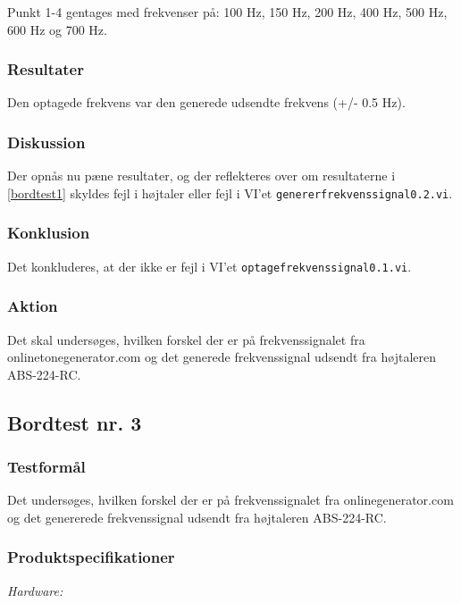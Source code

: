 			Punkt 1-4 gentages med frekvenser på: 100 Hz, 150 Hz, 200 Hz, 400 Hz, 500 Hz, 600 Hz og 700 Hz. 
			
			\subsubsection{Resultater}
			Den optagede frekvens var den generede udsendte frekvens (+/- 0.5 Hz). 
			\subsubsection{Diskussion}
			Der opnås nu pæne resultater, og der reflekteres over om resultaterne i \ref{bordtest1} skyldes fejl i højtaler eller fejl i VI'et \texttt{genererfrekvenssignal0.2.vi}. 
			\subsubsection{Konklusion}
			Det konkluderes, at der ikke er fejl i VI'et \texttt{optagefrekvenssignal0.1.vi}. 
			\subsubsection{Aktion}
			Det skal undersøges, hvilken forskel der er på frekvenssignalet fra onlinetonegenerator.com og det generede frekvenssignal udsendt fra højtaleren ABS-224-RC.  
	
		\subsection{Bordtest nr. 3} %
		\subsubsection{Testformål}
		Det undersøges, hvilken forskel der er på frekvenssignalet fra onlinegenerator.com og det genererede frekvenssignal udsendt fra højtaleren ABS-224-RC.  
		
		\subsubsection{Produktspecifikationer}
		
		\textit{Hardware:}\\
		\\
		\hojtalerkabel\\
		\pins\\
		\krympeflex
		\arduino\\
		\usbkabel\\
		\PC\\
		\mikrofon\\
	
